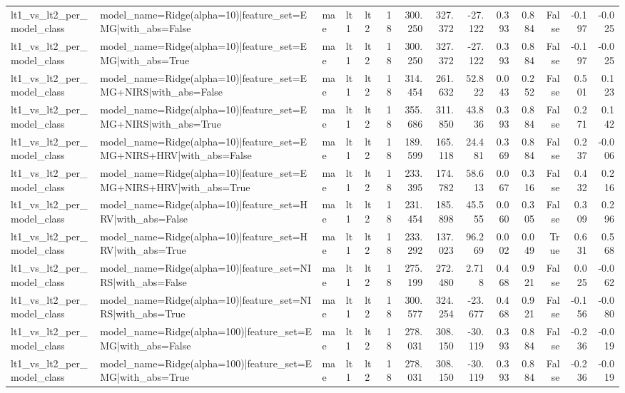 \begin{table}
\begin{tabular}{lllllrrrrrrrrr}
lt1_vs_lt2_per_model_class & model_name=Ridge(alpha=10)|feature_set=EMG|with_abs=False & mae & lt1 & lt2 & 18 & 300.250 & 327.372 & -27.122 & 0.393 & 0.884 & False & -0.197 & -0.025 \\
lt1_vs_lt2_per_model_class & model_name=Ridge(alpha=10)|feature_set=EMG|with_abs=True & mae & lt1 & lt2 & 18 & 300.250 & 327.372 & -27.122 & 0.393 & 0.884 & False & -0.197 & -0.025 \\
lt1_vs_lt2_per_model_class & model_name=Ridge(alpha=10)|feature_set=EMG+NIRS|with_abs=False & mae & lt1 & lt2 & 18 & 314.454 & 261.632 & 52.822 & 0.043 & 0.252 & False & 0.501 & 0.123 \\
lt1_vs_lt2_per_model_class & model_name=Ridge(alpha=10)|feature_set=EMG+NIRS|with_abs=True & mae & lt1 & lt2 & 18 & 355.686 & 311.850 & 43.836 & 0.393 & 0.884 & False & 0.271 & 0.142 \\
lt1_vs_lt2_per_model_class & model_name=Ridge(alpha=10)|feature_set=EMG+NIRS+HRV|with_abs=False & mae & lt1 & lt2 & 18 & 189.599 & 165.118 & 24.481 & 0.369 & 0.884 & False & 0.237 & -0.006 \\
lt1_vs_lt2_per_model_class & model_name=Ridge(alpha=10)|feature_set=EMG+NIRS+HRV|with_abs=True & mae & lt1 & lt2 & 18 & 233.395 & 174.782 & 58.613 & 0.067 & 0.316 & False & 0.432 & 0.216 \\
lt1_vs_lt2_per_model_class & model_name=Ridge(alpha=10)|feature_set=HRV|with_abs=False & mae & lt1 & lt2 & 18 & 231.454 & 185.898 & 45.555 & 0.060 & 0.305 & False & 0.309 & 0.296 \\
lt1_vs_lt2_per_model_class & model_name=Ridge(alpha=10)|feature_set=HRV|with_abs=True & mae & lt1 & lt2 & 18 & 233.292 & 137.023 & 96.269 & 0.002 & 0.049 & True & 0.631 & 0.568 \\
lt1_vs_lt2_per_model_class & model_name=Ridge(alpha=10)|feature_set=NIRS|with_abs=False & mae & lt1 & lt2 & 18 & 275.199 & 272.480 & 2.718 & 0.468 & 0.921 & False & 0.025 & -0.062 \\
lt1_vs_lt2_per_model_class & model_name=Ridge(alpha=10)|feature_set=NIRS|with_abs=True & mae & lt1 & lt2 & 18 & 300.577 & 324.254 & -23.677 & 0.468 & 0.921 & False & -0.156 & -0.080 \\
lt1_vs_lt2_per_model_class & model_name=Ridge(alpha=100)|feature_set=EMG|with_abs=False & mae & lt1 & lt2 & 18 & 278.031 & 308.150 & -30.119 & 0.393 & 0.884 & False & -0.236 & -0.019 \\
lt1_vs_lt2_per_model_class & model_name=Ridge(alpha=100)|feature_set=EMG|with_abs=True & mae & lt1 & lt2 & 18 & 278.031 & 308.150 & -30.119 & 0.393 & 0.884 & False & -0.236 & -0.019 \\

\end{tabular}
\end{table}
